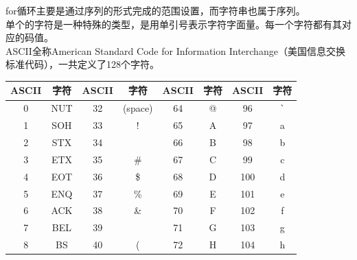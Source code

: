 for循环主要是通过序列的形式完成的范围设置，而字符串也属于序列。\\

单个的字符是一种特殊的类型，是用单引号表示字符字面量。每一个字符都有其对应的码值。\\

ASCII全称American Standard Code for Information Interchange（美国信息交换标准代码），一共定义了128个字符。

\begin{longtable}{|c|c|c|c|c|c|c|c|}
    \hline
    \textbf{ASCII} & \textbf{字符} & \textbf{ASCII} & \textbf{字符} & \textbf{ASCII} & \textbf{字符}          & \textbf{ASCII} & \textbf{字符}          \\
    \hline
    0              & NUT           & 32             & (space)       & 64             & @                      & 96             & \lstinline|`| \\
    \hline
    1              & SOH           & 33             & !             & 65             & A                      & 97             & a                      \\
    \hline
    2              & STX           & 34             & \text{"}      & 66             & B                      & 98             & b                      \\
    \hline
    3              & ETX           & 35             & \#            & 67             & C                      & 99             & c                      \\
    \hline
    4              & EOT           & 36             & \$            & 68             & D                      & 100            & d                      \\
    \hline
    5              & ENQ           & 37             & \%            & 69             & E                      & 101            & e                      \\
    \hline
    6              & ACK           & 38             & \&            & 70             & F                      & 102            & f                      \\
    \hline
    7              & BEL           & 39             & \text{'}      & 71             & G                      & 103            & g                      \\
    \hline
    8              & BS            & 40             & (             & 72             & H                      & 104            & h                      \\
    \hline

\end{longtable}
